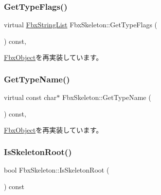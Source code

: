 \subsubsection{\texorpdfstring{Get\+Type\+Flags()}{GetTypeFlags()}}
{\footnotesize\ttfamily virtual \hyperlink{class_fbx_string_list}{Fbx\+String\+List} Fbx\+Skeleton\+::\+Get\+Type\+Flags (\begin{DoxyParamCaption}{ }\end{DoxyParamCaption}) const\hspace{0.3cm}{\ttfamily [protected]}, {\ttfamily [virtual]}}



\hyperlink{class_fbx_object_a6d30a5d00400039a248977cf9f9255b2}{Fbx\+Object}を再実装しています。

\mbox{\label{class_fbx_skeleton_a95bceb7989084e51a450525b4f57698b}} 
\subsubsection{\texorpdfstring{Get\+Type\+Name()}{GetTypeName()}}
{\footnotesize\ttfamily virtual const char$\ast$ Fbx\+Skeleton\+::\+Get\+Type\+Name (\begin{DoxyParamCaption}{ }\end{DoxyParamCaption}) const\hspace{0.3cm}{\ttfamily [protected]}, {\ttfamily [virtual]}}



\hyperlink{class_fbx_object_a817dcfa8f7f7e2437324e1e71377c4b2}{Fbx\+Object}を再実装しています。

\mbox{\label{class_fbx_skeleton_add6b0c308a1a815d0354066420a4bb17}} 
\subsubsection{\texorpdfstring{Is\+Skeleton\+Root()}{IsSkeletonRoot()}}
{\footnotesize\ttfamily bool Fbx\+Skeleton\+::\+Is\+Skeleton\+Root (\begin{DoxyParamCaption}{ }\end{DoxyParamCaption}) const}

